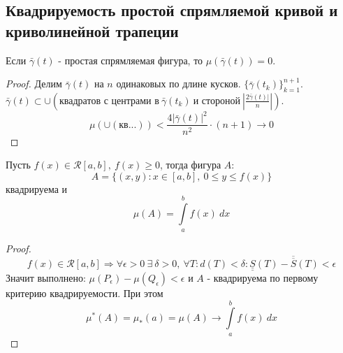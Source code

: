 \subsection{Квадрируемость простой спрямляемой кривой и криволинейной трапеции}
\begin{theorem}
    Если $\bar{\gamma}(t)$ - простая спрямляемая фигура, то $\mu(\bar{\gamma}(t))=0$.
\end{theorem} 
\begin{proof}
    Делим $\bar{\gamma}(t)$ на $n$ одинаковых по длине кусков. $\{\bar{\gamma}(t_k)\}_{k=1}^{n+1}$. $\bar{\gamma}(t)\subset \cup(\text{квадратов с центрами в}\  \bar{\gamma}(t_k)\ \text{и стороной}\ |\frac{2\bar{\gamma}(t)|}{n}|)$. 
    \[\mu(\cup(\text{кв...}))<\frac{4|\bar{\gamma}(t)|^2}{n^2}\cdot (n+1)\to 0\]
\end{proof} 
\begin{theorem}
    Пусть $f(x)\in \mathcal{R}[a,b],\ f(x)\geq 0$, тогда фигура $A:$ 
    \[A=\{(x,y): x\in[a,b],\ 0\leq y\leq f(x)\}\] квадрируема и 
    \[\mu(A)=\int\limits_{a}^{b}f(x)\ dx\]
\end{theorem} 
\begin{proof}
    \[f(x)\in \mathcal{R}[a,b] \Rightarrow \forall \epsilon>0\ \exists\ \delta>0,\ \forall T: d(T)<\delta: \underline{\underline{S}}(T)-\overline{\overline{S}}(T)<\epsilon\]
    Значит выполнено: $\mu(P_{\epsilon})-\mu(Q_{\epsilon})<\epsilon$ и $A$ - квадрируема по первому критерию квадрируемости. При этом
    \[\mu^*(A)=\mu_*(a)=\mu(A) \to \int\limits_{a}^{b}f(x)\ dx\]
\end{proof} 